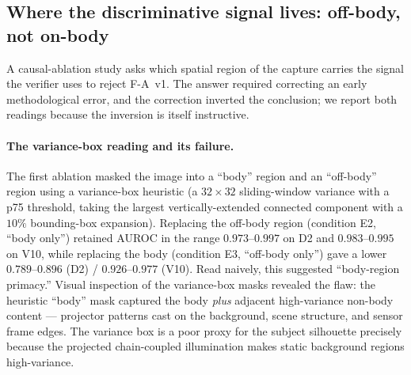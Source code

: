 \subsection{Where the discriminative signal lives: off-body, not on-body}
\label{sec:redteam_offbody}

A causal-ablation study asks which spatial region of the capture carries the signal the verifier uses to reject F-A~v1. The answer required correcting an early methodological error, and the correction inverted the conclusion; we report both readings because the inversion is itself instructive.

\paragraph{The variance-box reading and its failure.}
The first ablation masked the image into a ``body'' region and an ``off-body'' region using a variance-box heuristic (a $32\times32$ sliding-window variance with a p75 threshold, taking the largest vertically-extended connected component with a $10\%$ bounding-box expansion). Replacing the off-body region (condition E2, ``body only'') retained AUROC in the range $0.973$--$0.997$ on D2 and $0.983$--$0.995$ on V10, while replacing the body (condition E3, ``off-body only'') gave a lower $0.789$--$0.896$ (D2) / $0.926$--$0.977$ (V10). Read naively, this suggested ``body-region primacy.'' Visual inspection of the variance-box masks revealed the flaw: the heuristic ``body'' mask captured the body \emph{plus} adjacent high-variance non-body content --- projector patterns cast on the background, scene structure, and sensor frame edges. The variance box is a poor proxy for the subject silhouette precisely because the projected chain-coupled illumination makes static background regions high-variance.

